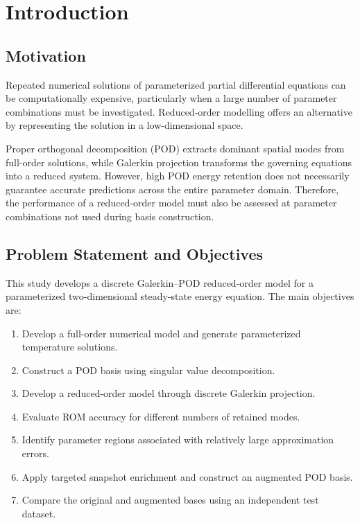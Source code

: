 \section{Introduction}

\subsection{Motivation}

Repeated numerical solutions of parameterized partial differential equations can be computationally expensive, particularly when a large number of parameter combinations must be investigated. Reduced-order modelling offers an alternative by representing the solution in a low-dimensional space.

Proper orthogonal decomposition (POD) extracts dominant spatial modes from full-order solutions, while Galerkin projection transforms the governing equations into a reduced system. However, high POD energy retention does not necessarily guarantee accurate predictions across the entire parameter domain. Therefore, the performance of a reduced-order model must also be assessed at parameter combinations not used during basis construction.

\subsection{Problem Statement and Objectives}

This study develops a discrete Galerkin--POD reduced-order model for a parameterized two-dimensional steady-state energy equation. The main objectives are:

\begin{enumerate}
    \item Develop a full-order numerical model and generate parameterized temperature solutions.
    \item Construct a POD basis using singular value decomposition.
    \item Develop a reduced-order model through discrete Galerkin projection.
    \item Evaluate ROM accuracy for different numbers of retained modes.
    \item Identify parameter regions associated with relatively large approximation errors.
    \item Apply targeted snapshot enrichment and construct an augmented POD basis.
    \item Compare the original and augmented bases using an independent test dataset.
\end{enumerate}


